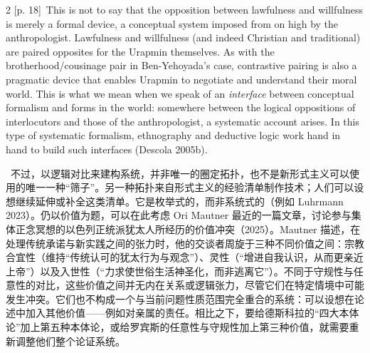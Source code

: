 \documentclass[10pt,a4paper]{article}
\begin{document}
\begin{paracol}{2}
\switchcolumn
{\scriptsize\color{gray} [p. 18]}\ This is not to say that the opposition between lawfulness and willfulness is merely a formal device, a conceptual system imposed from on high by the anthropologist. Lawfulness and willfulness (and indeed Christian and traditional) are paired opposites for the Urapmin themselves. As with the brotherhood/cousinage pair in Ben-Yehoyada’s case, contrastive pairing is also a pragmatic device that enables Urapmin to negotiate and understand their moral world. This is what we mean when we speak of an \textit{interface} between conceptual formalism and forms in the world: somewhere between the logical oppositions of interlocutors and those of the anthropologist, a systematic account arises. In this type of systematic formalism, ethnography and deductive logic work hand in hand to build such interfaces (Descola 2005b).\par
\switchcolumn*
{\scriptsize\color{gray} [p. 18]}\ 不过，以逻辑对比来建构系统，并非唯一的圈定拓扑，也不是新形式主义可以使用的唯一一种“筛子”。另一种拓扑来自形式主义的经验清单制作技术；人们可以设想继续延伸或补全这类清单。它是枚举式的，而非系统式的（例如 Luhrmann 2023）。仍以价值为题，可以在此考虑 Ori Mautner 最近的一篇文章，讨论参与集体正念冥想的以色列正统派犹太人所经历的价值冲突（2025）。Mautner 描述，在处理传统承诺与新实践之间的张力时，他的交谈者周旋于三种不同价值之间：宗教合宜性（维持“传统认可的犹太行为与观念”）、灵性（“增进自我认识，从而更亲近上帝”）以及入世性（“力求使世俗生活神圣化，而非逃离它”）。不同于守规性与任意性的对比，这些价值之间并无内在关系或逻辑张力，尽管它们在特定情境中可能发生冲突。它们也不构成一个与当前问题性质范围完全重合的系统：可以设想在论述中加入其他价值——例如对亲属的责任。相比之下，要给德斯科拉的“四大本体论”加上第五种本体论，或给罗宾斯的任意性与守规性加上第三种价值，就需要重新调整他们整个论证系统。\par
\switchcolumn

\end{paracol}
\end{document}
